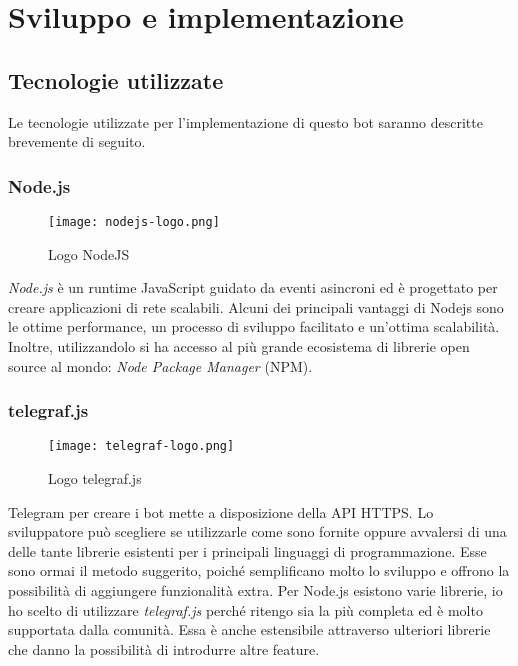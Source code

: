 \chapter{Sviluppo e implementazione}
\label{cha:sviluppo_implementazione}

\section{Tecnologie utilizzate}
\label{sec:tecnologie}

Le tecnologie utilizzate per l'implementazione di questo bot saranno descritte brevemente di seguito. 

\subsection{Node.js}

\begin{wrapfigure}{r}{0.33\textwidth}
\centering
\texttt{[image: nodejs-logo.png]}
\caption{Logo NodeJS}
\end{wrapfigure}

\textit{Node.js} è un runtime JavaScript guidato da eventi asincroni ed è progettato per creare applicazioni di rete scalabili. Alcuni dei principali vantaggi di Nodejs sono le ottime performance, un processo di sviluppo facilitato e un'ottima scalabilità. Inoltre, utilizzandolo si ha accesso al più grande ecosistema di librerie open source al mondo: \textit{Node Package Manager} (NPM).

\subsection{telegraf.js}

\begin{wrapfigure}{r}{0.33\textwidth}
\centering
\texttt{[image: telegraf-logo.png]}
\caption{Logo telegraf.js}
\end{wrapfigure}

Telegram per creare i bot mette a disposizione della API HTTPS. Lo sviluppatore può scegliere se utilizzarle come sono fornite oppure avvalersi di una delle tante librerie esistenti per i principali linguaggi di programmazione. Esse sono ormai il metodo suggerito, poiché semplificano molto lo sviluppo e offrono la possibilità di aggiungere funzionalità extra. Per Node.js esistono varie librerie, io ho scelto di utilizzare \textit{telegraf.js} perché ritengo sia la più completa ed è molto supportata dalla comunità. Essa è anche estensibile attraverso ulteriori librerie che danno la possibilità di introdurre altre feature.

